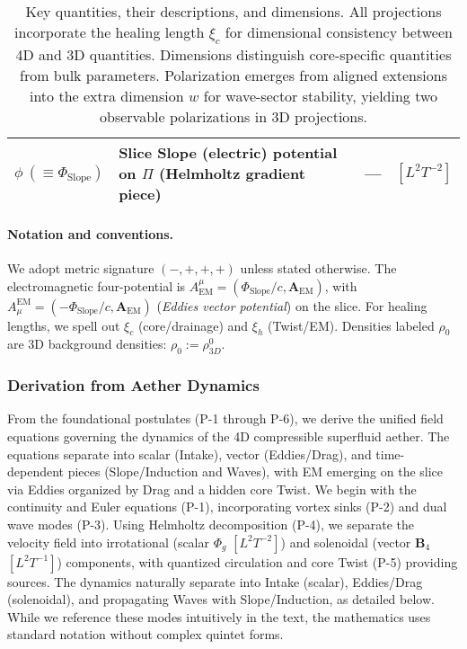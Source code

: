 \begin{table}[H]
\begin{tabularx}{\textwidth}{|l|Y|l|l|}
\hline
$\phi\ (\equiv \Phi_{\text{Slope}})$ & Slice Slope (electric) potential on $\Pi$ (Helmholtz gradient piece) & --- & $[L^2 T^{-2}]$ \\
\hline
\end{tabularx}
\endgroup
\caption{Key quantities, their descriptions, and dimensions. All projections incorporate the healing length $\xi_c$ for dimensional consistency between 4D and 3D quantities. Dimensions distinguish core-specific quantities from bulk parameters. Polarization emerges from aligned extensions into the extra dimension $w$ for wave-sector stability, yielding two observable polarizations in 3D projections.}
\label{tab:notation}
\end{table}
\paragraph{Notation and conventions.}
We adopt metric signature $(-,+,+,+)$ unless stated otherwise.
The electromagnetic four-potential is $A^\mu_{\text{EM}}=(\Phi_{\text{Slope}}/c,\mathbf A_{\text{EM}})$, with $A_{\mu}^{\text{EM}} = (-\Phi_{\text{Slope}}/c,\mathbf A_{\text{EM}})$ (\emph{Eddies vector potential}) on the slice. For healing lengths, we spell out $\xi_c$ (core/drainage) and $\xi_h$ (Twist/EM). Densities labeled $\rho_0$ are 3D background densities: $\rho_0 := \rho_{3D}^0$.

\subsubsection{Derivation from Aether Dynamics}

From the foundational postulates (P-1 through P-6), we derive the unified field equations governing the dynamics of the 4D compressible superfluid aether. The equations separate into scalar (Intake), vector (Eddies/Drag), and time-dependent pieces (Slope/Induction and Waves), with EM emerging on the slice via Eddies organized by Drag and a hidden core Twist. We begin with the continuity and Euler equations (P-1), incorporating vortex sinks (P-2) and dual wave modes (P-3). Using Helmholtz decomposition (P-4), we separate the velocity field into irrotational (scalar $\Phi_g$ $[L^2 T^{-2}]$) and solenoidal (vector $\mathbf{B}_4$ $[L^2 T^{-1}]$) components, with quantized circulation and core Twist (P-5) providing sources. The dynamics naturally separate into Intake (scalar), Eddies/Drag (solenoidal), and propagating Waves with Slope/Induction, as detailed below. While we reference these modes intuitively in the text, the mathematics uses standard notation without complex quintet forms.

